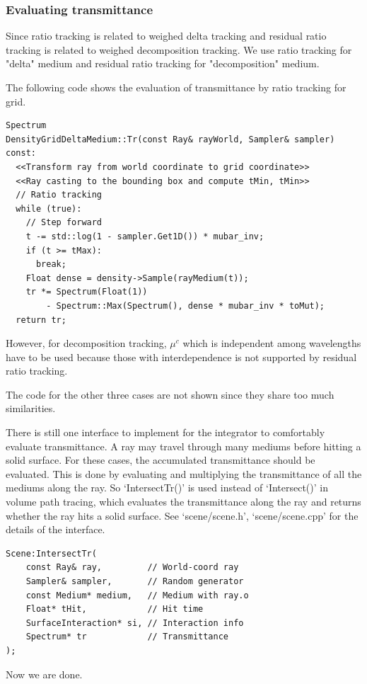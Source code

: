 \documentclass[acmtog]{acmart}
\begin{document}
\subsubsection{Evaluating transmittance}
    Since ratio tracking is related to weighed delta tracking and residual ratio tracking is related to weighed decomposition tracking.
    We use ratio tracking for "delta" medium and residual ratio tracking for "decomposition" medium.\par
        The following code shows the evaluation of transmittance by ratio tracking for grid.
\lstset{basicstyle=\tiny\ttfamily}
\begin{lstlisting}
Spectrum
DensityGridDeltaMedium::Tr(const Ray& rayWorld, Sampler& sampler) const:
  <<Transform ray from world coordinate to grid coordinate>>
  <<Ray casting to the bounding box and compute tMin, tMin>>
  // Ratio tracking
  while (true):
    // Step forward
    t -= std::log(1 - sampler.Get1D()) * mubar_inv;
    if (t >= tMax):
      break;
    Float dense = density->Sample(rayMedium(t));
    tr *= Spectrum(Float(1)) 
        - Spectrum::Max(Spectrum(), dense * mubar_inv * toMut);
  return tr;
\end{lstlisting}
\lstset{basicstyle=\small\ttfamily}
    However, for decomposition tracking, $\mu^c$ which is independent among wavelengths have to be used
    because those with interdependence is not supported by residual ratio tracking.\par
        The code for the other three cases are not shown since they share too much similarities.\par
        There is still one interface to implement for the integrator to comfortably evaluate transmittance.
    A ray may travel through many mediums before hitting a solid surface.
    For these cases, the accumulated transmittance should be evaluated.
    This is done by evaluating and multiplying the transmittance of all the mediums along the ray.
    So `IntersectTr()' is used instead of `Intersect()' in volume path tracing, 
    which evaluates the transmittance along the ray and returns whether the ray hits a solid surface.
    See `scene/scene.h', `scene/scene.cpp' for the details of the interface.
\begin{lstlisting}
Scene:IntersectTr(
    const Ray& ray,         // World-coord ray
    Sampler& sampler,       // Random generator
    const Medium* medium,   // Medium with ray.o
    Float* tHit,            // Hit time
    SurfaceInteraction* si, // Interaction info
    Spectrum* tr            // Transmittance
);
\end{lstlisting}
    Now we are done.
\end{document}

